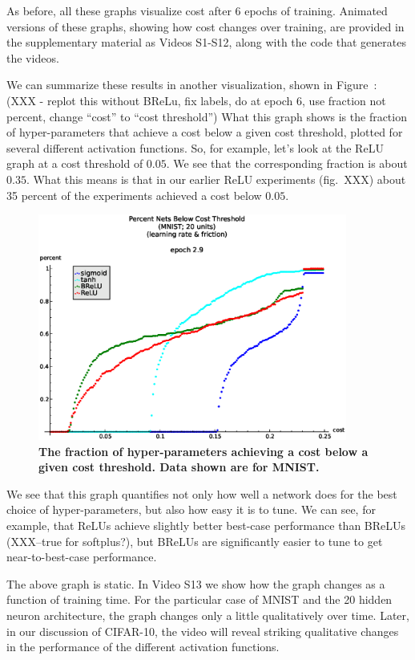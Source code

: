 \documentclass[10pt]{article}
\begin{document}
As before, all these graphs visualize cost after 6 epochs of
training. Animated versions of these graphs, showing how cost changes
over training, are provided in the supplementary material as Videos
S1-S12, along with the code that generates the videos.

We can summarize these results in another visualization, shown in
Figure~\label{fig:fraction}: (XXX - replot this without BReLu, fix
labels, do at epoch 6, use fraction not percent, change ``cost'' to
``cost threshold'') What this graph shows is the fraction of
hyper-parameters that achieve a cost below a given cost threshold,
plotted for several different activation functions.  So, for example,
let's look at the ReLU graph at a cost threshold of $0.05$.  We see
that the corresponding fraction is about $0.35$.  What this means is
that in our earlier ReLU experiments (fig.~XXX) about 35 percent of
the experiments achieved a cost below $0.05$.

\begin{figure}[!ht]
\begin{center}
\includegraphics[width=4in]{plots/detailed/LF-20a10a-20T10-MNIST-3-percent.eps}
\end{center}
\caption{ {\bf The fraction of hyper-parameters achieving a cost below
    a given cost threshold. Data shown are for MNIST.}}
\label{fig:fraction}
\end{figure}

We see that this graph quantifies not only how well a network does for
the best choice of hyper-parameters, but also how easy it is to tune.
We can see, for example, that ReLUs achieve slightly better best-case
performance than BReLUs (XXX--true for softplus?), but BReLUs are
significantly easier to tune to get near-to-best-case performance.

The above graph is static.  In Video S13 we show how the graph changes
as a function of training time.  For the particular case of MNIST and
the 20 hidden neuron architecture, the graph changes only a little
qualitatively over time.  Later, in our discussion of CIFAR-10, the
video will reveal striking qualitative changes in the performance of
the different activation functions.
\end{document}
